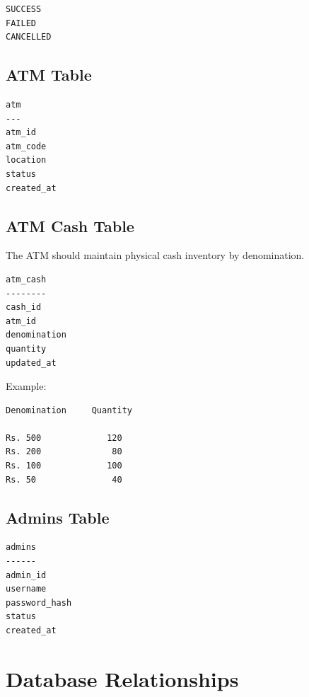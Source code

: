 \documentclass[12pt,a4paper]{article}
\begin{document}
\begin{verbatim}
SUCCESS
FAILED
CANCELLED
\end{verbatim}


\subsection{ATM Table}

\begin{verbatim}
atm
---
atm_id
atm_code
location
status
created_at
\end{verbatim}


\subsection{ATM Cash Table}

The ATM should maintain physical cash inventory by denomination.

\begin{verbatim}
atm_cash
--------
cash_id
atm_id
denomination
quantity
updated_at
\end{verbatim}

Example:

\begin{verbatim}
Denomination     Quantity

Rs. 500             120
Rs. 200              80
Rs. 100             100
Rs. 50               40
\end{verbatim}


\subsection{Admins Table}

\begin{verbatim}
admins
------
admin_id
username
password_hash
status
created_at
\end{verbatim}


\section{Database Relationships}
\end{document}
